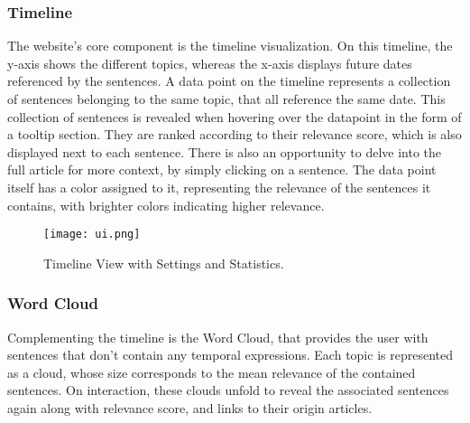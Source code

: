 \documentclass[sigconf]{acmart}
\begin{document}
\subsubsection{Timeline}
The website's core component is the timeline visualization. On this timeline, the y-axis shows the different topics, whereas the x-axis displays future dates referenced by the sentences. A data point on the timeline represents a collection of sentences belonging to the same topic, that all reference the same date. This collection of sentences is revealed when hovering over the datapoint in the form of a tooltip section. They are ranked according to their relevance score, which is also displayed next to each sentence. There is also an opportunity to delve into the full article for more context, by simply clicking on a sentence. The data point itself has a color assigned to it, representing the relevance of the sentences it contains, with brighter colors indicating higher relevance.

\begin{figure}[H]
\centering
\texttt{[image: ui.png]}
\caption{Timeline View with Settings and Statistics.}
\label{fig:ui}
\end{figure}


\subsubsection{Word Cloud}
Complementing the timeline is the Word Cloud, that provides the user with sentences that don't contain any temporal expressions. Each topic is represented as a cloud, whose size corresponds to the mean relevance of the contained sentences. On interaction, these clouds unfold to reveal the associated sentences again along with relevance score, and links to their origin articles.

\end{document}
